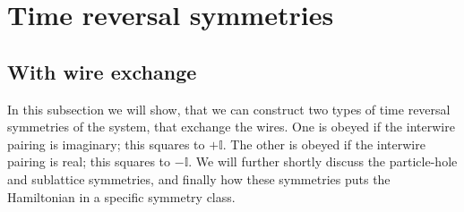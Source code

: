 \section{Time reversal symmetries} \label{sec.2wirestimereversalsymmetries}

\subsection{With wire exchange}
\label{subsec.TRwireexchange}
In this subsection we will show, that we can construct two types of time reversal symmetries of the system, that exchange the wires. One is obeyed if the interwire pairing is imaginary; this squares to $+\mathbb{I}$. The other is obeyed if the interwire pairing is real; this squares to $-\mathbb{I}$. We will further shortly discuss the particle-hole and sublattice symmetries, and finally how these symmetries puts the Hamiltonian in a specific symmetry class. 

